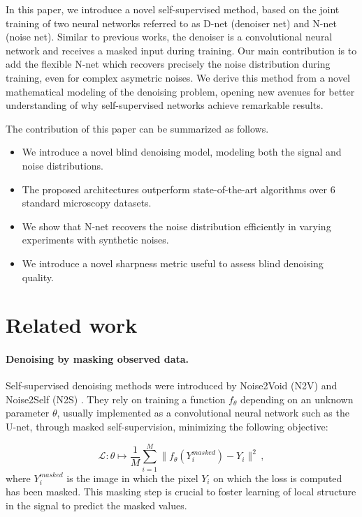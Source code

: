 \documentclass{article}
\begin{document}
In this paper, we introduce a novel self-supervised method, based on the joint training of two neural networks referred to as D-net (denoiser net) and N-net (noise net). Similar to previous works, the denoiser is a convolutional neural network and receives a masked input during training. Our main contribution is to add the flexible N-net 
which recovers precisely the noise distribution during training, even for complex asymetric noises. We derive this method from a novel mathematical modeling of the denoising problem, opening new avenues for better understanding of why self-supervised networks achieve remarkable results.

The contribution of this paper can be summarized as follows.
\begin{itemize}
  \item We introduce a novel blind denoising model, modeling both the signal and noise distributions.
  \item The proposed architectures outperform state-of-the-art algorithms  over 6 standard microscopy datasets.
  \item We show that N-net recovers the noise distribution efficiently in varying experiments with synthetic noises.
  \item We introduce a novel sharpness metric useful to assess blind denoising quality.
\end{itemize}

\section{Related work}
\label{sec:related}
\paragraph{Denoising by masking observed data.}
Self-supervised denoising methods were introduced by Noise2Void (N2V) \cite{krull2018noise2void} and Noise2Self (N2S) \cite{batson2019noise2self}. They rely on training a function $f_\theta$ depending on an unknown parameter $\theta$, usually  implemented as a convolutional neural network such as the U-net, through masked self-supervision, minimizing the following objective:

$$\mathcal{L}: \theta\mapsto \frac{1}{M}\sum_{i=1}^M \|f_\theta(Y^{masked}_i) - Y_i\|^2\,, $$
where $Y^{masked}_i$ is the image in which the pixel $Y_i$  on which the loss is computed  has been masked. This masking step is crucial to foster learning of  local structure in the signal to predict the masked values.
\end{document}
